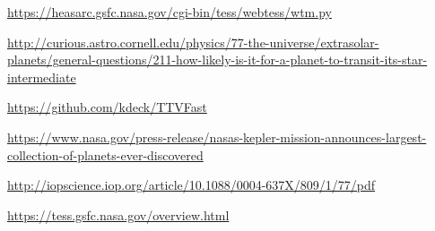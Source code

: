 \documentclass[titlepage]{article}
\begin{document}
	

\begin{thebibliography}{9}

	
		\url{https://heasarc.gsfc.nasa.gov/cgi-bin/tess/webtess/wtm.py}
		
		\url{http://curious.astro.cornell.edu/physics/77-the-universe/extrasolar-planets/general-questions/211-how-likely-is-it-for-a-planet-to-transit-its-star-intermediate}
		
		\url{https://github.com/kdeck/TTVFast}
		
		\url{https://www.nasa.gov/press-release/nasas-kepler-mission-announces-largest-collection-of-planets-ever-discovered}
		
		\url{http://iopscience.iop.org/article/10.1088/0004-637X/809/1/77/pdf}
		
		\url{https://tess.gsfc.nasa.gov/overview.html}
		
\end{thebibliography}
\end{document}
